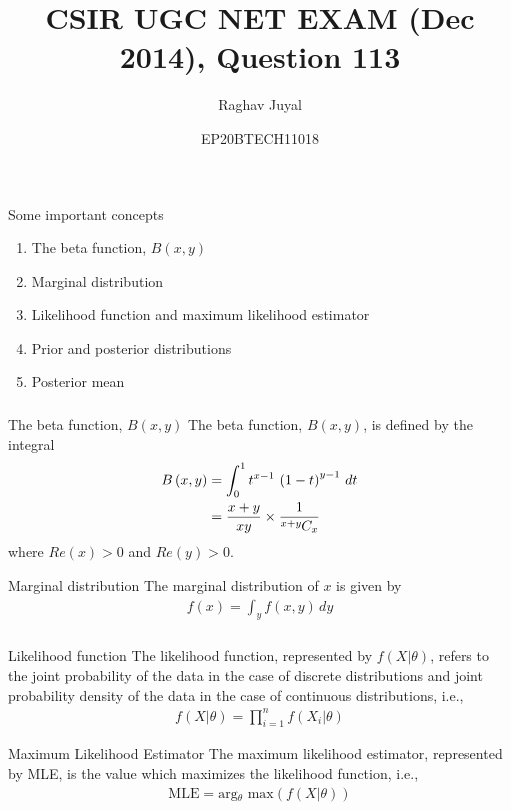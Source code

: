 \documentclass{beamer}
\title{CSIR UGC NET EXAM (Dec 2014), Question 113}
\author{Raghav Juyal}
\date{EP20BTECH11018}
\providecommand{\brak}[1]{\ensuremath{\left(#1\right)}}
\newcommand*{\permcomb}[4][0mu]{{{}^{#3}\mkern#1#2_{#4}}}
\newcommand*{\comb}[1][-1mu]{\permcomb[#1]{C}}
\begin{document}
\begin{frame}
\titlepage
\end{frame}

\begin{frame}
    \frametitle{}
    \begin{block}{Some important concepts}
      \begin{enumerate}
        \item The beta function, $B\brak{x,y}$
        \item Marginal distribution
        \item Likelihood function and maximum likelihood estimator
        \item Prior and posterior distributions
        \item Posterior mean
      \end{enumerate}
    \end{block}
\end{frame}

\begin{frame}
    \frametitle{}
    \begin{block}{The beta function, $B\brak{x,y}$}
        The beta function, $B\brak{x,y}$, is defined by the integral
        \begin{align}
            B\brak{x,y} &= \int_0^1 t^{x-1}\,\brak{1-t}^{y-1}\,dt\nonumber\\
            &= \frac{x+y}{xy}\times \frac{1}{\comb{x+y}{x}}\label{eq1}
        \end{align}
        where $Re\brak{x}>0$ and $Re\brak{y}>0$.
    \end{block}
    \begin{block}{Marginal distribution}
        The marginal distribution of $x$ is given by
        \begin{align}
            f\brak{x} = \int_y f\brak{x,y}\,dy\label{eq2}
        \end{align}
     \end{block}
\end{frame}

\begin{frame}
\frametitle{}
    \begin{block}{Likelihood function}
     The likelihood function, represented by $f\brak{X|\theta}$, refers to the joint probability of the data in the case of discrete distributions and joint probability density of the data in the case of continuous distributions, i.e., 
\begin{align}
    f\brak{X|\theta} = \prod_{i=1}^n f\brak{X_i|\theta}\label{eq3}
\end{align}
    \end{block}
    \begin{block}{Maximum Likelihood Estimator}
    The maximum likelihood estimator, represented by MLE, is the value which maximizes the likelihood function, i.e.,
    \begin{align}
     \text{MLE} = \text{arg$_{\theta}$ max}\brak{f\brak{X|\theta}}\label{eq4}
    \end{align}
    \end{block}
\end{frame}
\end{document}
